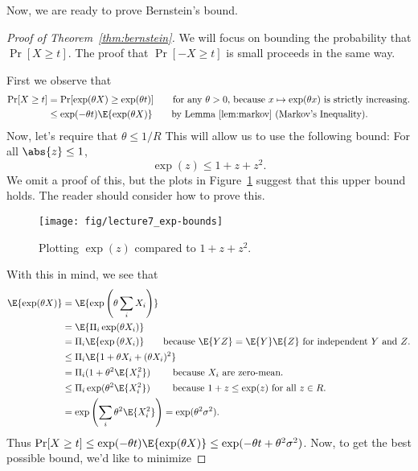 Now, we are ready to prove Bernstein's bound.
\begin{proof}[Proof of Theorem~\ref{thm:bernstein}]
  We will focus on bounding the probability that $\Pr[ X \geq t] $.
  The proof that $\Pr[ -X \geq t] $ is small proceeds in the same way.

  First we observe that
  \begin{align*}
    \Pr[ X \geq t ]
    &=
      \Pr [ \exp(\theta X) \geq \exp(\theta t) ]
      \tag*{for any $\theta >0$,
      because $x \mapsto \exp(\theta x)$ is strictly increasing.}
    \\
    &\leq \exp(-\theta t) \E{\exp(\theta X)}
      \tag*{by Lemma~\ref{lem:markov} (Markov's Inequality).}
  \end{align*}
  Now, let's require that $\theta \leq 1/R$
  This will allow us to use the following bound: For all $\abs{z}
  \leq 1$,
  \begin{equation}
     \label{eq:expub}
  \exp(z) \leq 1+z+z^2.
\end{equation}
We omit a proof of this, but the plots in Figure~\ref{fig:expub}
suggest that this upper bound holds. The reader should consider how to
prove this.
\begin{figure}[h]
  \centering
  \texttt{[image: fig/lecture7\_exp-bounds]}
\caption{Plotting $\exp(z)$ compared to $1+z+z^2$.}
\label{fig:expub}
\end{figure}
With this in mind, we see that
\begin{align*}
  \E{\exp(\theta X)}
  &= \E{\exp\left(\theta \sum_i X_i\right)}
  \\
  &=\E{\Pi_{i} \exp(\theta X_i)}
  \\
  &=\Pi_{i} \E{\exp{(\theta X_i)}}
    \tag*{because $\E{YZ} = \E{Y}\E{Z}$ for independent $Y$ and
    $Z$.} %
  \\
  &\leq\Pi_{i} \E{1+\theta X_i+(\theta X_i)^2}
  \\
  &=\Pi_{i} (1+\theta^2\E{ X_i^2})
    \tag*{ because $X_i$ are zero-mean.}
  \\
  &\leq\Pi_{i} \exp( \theta^2\E{ X_i^2} )
    \tag*{ because $1+z \leq \exp(z)$ for all $z \in R$.}
  \\
  &=\exp\left( \sum_i \theta^2\E{ X_i^2} \right) = \exp(\theta^2 \sigma^2)
    .
\end{align*}
Thus
$\Pr[ X \geq t ] \leq \exp(-\theta t)\E{\exp(\theta X)} \leq
\exp(-\theta t + \theta^2 \sigma^2)$.
Now, to get the best possible bound, we'd like to minimize

\end{proof}
